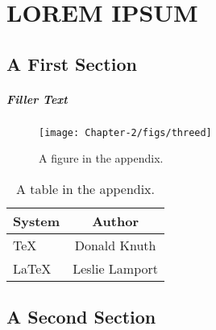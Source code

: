 \chapter{LOREM IPSUM}

\section{A First Section}

\paragraph{Filler Text} \lipsum[1-6]
%
\begin{figure}
  \centering
  \texttt{[image: Chapter-2/figs/threed]}
  \caption{A figure in the appendix.}
  \label{fig:app}
\end{figure}
%
\lipsum[7-10]
\begin{table}
  \caption{A table in the appendix.}
  \label{tab:app}
  \begin{center}
    \begin{tabular}{lc}
      \toprule
      System & Author \\
      \midrule
      \TeX   & Donald Knuth   \\
      \LaTeX & Leslie Lamport \\
      \bottomrule
    \end{tabular}
  \end{center}
\end{table}
%

\section{A Second Section}

\lipsum[14-15]
